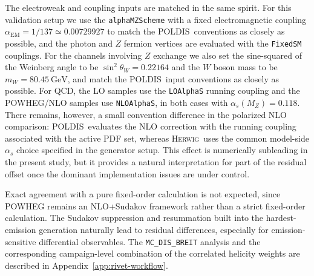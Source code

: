 \documentclass[a4paper,11pt]{article}
\newcommand{\Herwig}{\textsc{Herwig}}
\newcommand{\POLDIS}{\textsc{POLDIS}}
\begin{document}
The electroweak and coupling inputs are matched in the same spirit. For this validation setup we use the
\texttt{alphaMZScheme} with a fixed electromagnetic coupling $\alpha_{\mathrm{EM}}=1/137 \simeq 0.00729927$ to match the \POLDIS\ conventions as closely as possible, and the photon and $Z$ fermion vertices are evaluated with the
\texttt{FixedSM} couplings. For the channels involving $Z$ exchange we also set the sine-squared of the Weinberg angle to be
$\sin^2\theta_W=0.22164$ and the $W$ boson mass to be $m_W=80.45~\mathrm{GeV}$, and match the
\POLDIS\ input conventions as closely as possible. For QCD, the LO samples use
the \texttt{LOAlphaS} running coupling and the \textsc{POWHEG}/NLO samples use
\texttt{NLOAlphaS}, in both cases with $\alpha_s(M_Z)=0.118$.
There remains, however, a small convention difference in the polarized NLO
comparison: \POLDIS\ evaluates the NLO correction with the running coupling
associated with the active PDF set, whereas \Herwig\ uses the common model-side
$\alpha_s$ choice specified in the generator setup. This effect is numerically
subleading in the present study, but it provides a natural interpretation for
part of the residual offset once the dominant implementation issues are under
control.

Exact agreement with a pure fixed-order calculation is not expected, since \textsc{POWHEG}
remains an NLO+Sudakov framework rather than a strict fixed-order calculation.
The Sudakov suppression and resummation built into the hardest-emission
generation naturally lead to residual differences, especially for
emission-sensitive differential observables.
The \texttt{MC\_DIS\_BREIT} analysis and the corresponding campaign-level
combination of the correlated helicity weights are described in
Appendix~\ref{app:rivet-workflow}.
\end{document}
